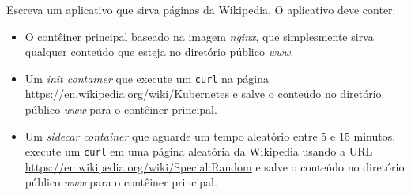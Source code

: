 \documentclass[11pt,a4paper]{article}
\begin{document}
\begin{tcolorbox}[colback=blue!5!white,colframe=blue!75!black,title=Exercício: 5.4. Wikipedia com init e sidecar]
Escreva um aplicativo que sirva páginas da Wikipedia. O aplicativo deve conter:

\begin{itemize}
    \item O contêiner principal baseado na imagem \textit{nginx}, que simplesmente sirva qualquer conteúdo que esteja no diretório público \textit{www}.
    \item Um \textit{init container} que execute um \texttt{curl} na página \url{https://en.wikipedia.org/wiki/Kubernetes} e salve o conteúdo no diretório público \textit{www} para o contêiner principal.
    \item Um \textit{sidecar container} que aguarde um tempo aleatório entre 5 e 15 minutos, execute um \texttt{curl} em uma página aleatória da Wikipedia usando a URL \url{https://en.wikipedia.org/wiki/Special:Random} e salve o conteúdo no diretório público \textit{www} para o contêiner principal.
\end{itemize}
\end{tcolorbox}
\end{document}
